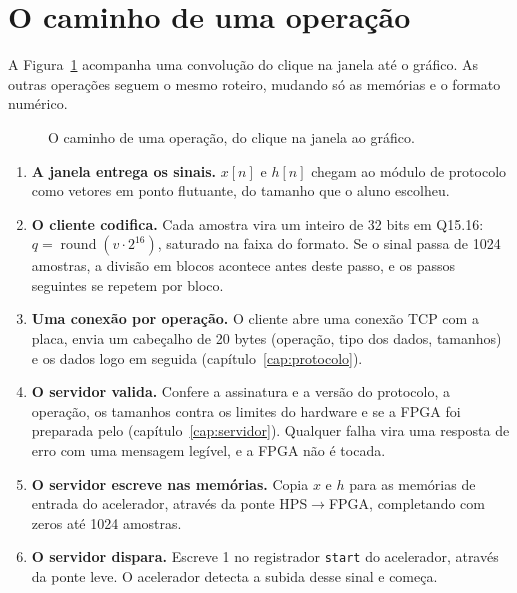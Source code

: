 \section{O caminho de uma operação}
\label{sec:caminho}

A Figura~\ref{fig:sequencia} acompanha uma convolução do clique na janela até o
gráfico. As outras operações seguem o mesmo roteiro, mudando só as memórias e o
formato numérico.

\begin{figure}[htbp]
  \centering
  \caption{O caminho de uma operação, do clique na janela ao gráfico.}
  \label{fig:sequencia}
\end{figure}

\begin{enumerate}
  \item \textbf{A janela entrega os sinais.} \(x[n]\) e \(h[n]\) chegam ao
    módulo de protocolo como vetores em ponto flutuante, do tamanho que o aluno
    escolheu.

  \item \textbf{O cliente codifica.} Cada amostra vira um inteiro de 32 bits em
    Q15.16: \(q = \operatorname{round}(v \cdot 2^{16})\), saturado na faixa do
    formato. Se o sinal passa de 1024 amostras, a divisão em blocos acontece
    antes deste passo, e os passos seguintes se repetem por bloco.

  \item \textbf{Uma conexão por operação.} O cliente abre uma conexão TCP com a
    placa, envia um cabeçalho de 20 bytes (operação, tipo dos dados, tamanhos) e
    os dados logo em seguida (capítulo~\ref{cap:protocolo}).

  \item \textbf{O servidor valida.} Confere a assinatura e a versão do
    protocolo, a operação, os tamanhos contra os limites do hardware e se a FPGA
    foi preparada pelo  (capítulo~\ref{cap:servidor}). Qualquer
    falha vira uma resposta de erro com uma mensagem legível, e a FPGA não é
    tocada.

  \item \textbf{O servidor escreve nas memórias.} Copia \(x\) e \(h\) para as
    memórias de entrada do acelerador, através da ponte HPS\(\to\)FPGA,
    completando com zeros até 1024 amostras.

  \item \textbf{O servidor dispara.} Escreve 1 no registrador \texttt{start}
    do acelerador, através da ponte leve. O acelerador detecta a subida desse
    sinal e começa.


\end{enumerate}
